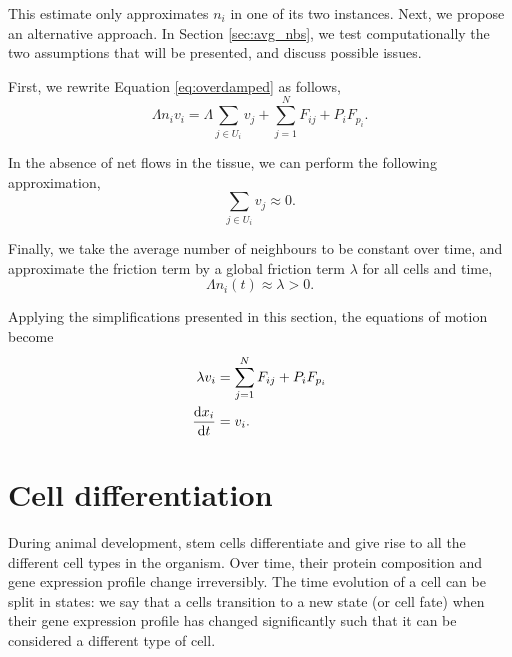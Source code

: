 This estimate only approximates $n_i$ in one of its two instances. Next, we propose an alternative approach. In Section \ref{sec:avg_nbs}, we test computationally the two assumptions that will be presented, and discuss possible issues. 

First, we rewrite Equation \ref{eq:overdamped} as follows,
\begin{equation}
    \Lambda n_i v_i =\Lambda\sum_{j\in U_i}v_j+\sum_{j=1}^{N} F_{ij} + P_i F_{p_i}.
\end{equation}

In the absence of net flows in the tissue, we can perform the following approximation,
\begin{equation}\label{eq:netflows}
    \sum_{j\in U_i}v_j\approx 0.
\end{equation}

Finally, we take the average number of neighbours to be constant over time, and approximate the friction term by a global friction term $\lambda$ for all cells and time,
\begin{equation}\label{eq:globalfriction}
    \Lambda n_i(t) \approx \lambda>0.
\end{equation}

\begin{proposition}
    Applying the simplifications presented in this section, the equations of motion become
    \begin{align}\label{eq:motion_dim}
        \begin{aligned}
            \lambda v_i &= \sum_{j=1}^{N} F_{ij} + P_i F_{p_i}\\
            \frac{\mathrm{d} x_i}{\mathrm{d} t} &=v_i.
        \end{aligned}
    \end{align}
\end{proposition}



\section{Cell differentiation}\label{sec:diff}

During animal development, stem cells differentiate and give rise to all the different cell types in the organism. Over time, their protein composition and gene expression profile change irreversibly. The time evolution of a cell can be split in states: we say that a cells transition to a new state (or cell fate) when their gene expression profile has changed significantly such that it can be considered a different type of cell.

